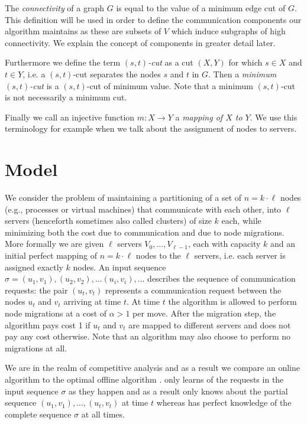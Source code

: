 \documentclass[a4paper,UKenglish,cleveref, autoref, thm-restate,authorcolumns]{lipics-v2019}
\newcommand{\opt}{\text{O{\scriptsize PT}}}
\newcommand{\onl}{\text{O{\scriptsize NL}}}
\begin{document}
The \textit{connectivity} of a graph $G$ is equal to the value of a minimum edge cut of $G$. This definition will be used in order to define the communication components our algorithm maintains as these are subsets of $V$ which induce subgraphs of high connectivity. We explain the concept of components in greater detail later.

Furthermore we define the term $(s,t)$\textit{-cut} as a cut $(X,Y)$ for which $s\in X$ and $t\in Y$, i.e. a $(s,t)$-cut separates the nodes $s$ and $t$ in $G$. Then a \textit{minimum $(s,t)$-cut} is a $(s,t)$-cut of minimum value. Note that a minimum $(s,t)$-cut is not necessarily a minimum cut.

Finally we call an injective function $m:X\rightarrow Y$ a \textit{mapping of $X$ to $Y$}. We use this terminology for example when we talk about the assignment of nodes to servers.

\sloppy

\section{Model}
\label{problem_definition_section}

We consider the problem of maintaining a partitioning of a 
set of $n=k\cdot \ell$ nodes (e.g., processes or virtual machines) 
that communicate with each other, 
into $\ell$ servers (henceforth sometimes also called clusters) of size $k$ each, 
while minimizing both the cost due to communication and due to node migrations. 
More formally we are given $\ell$ servers $V_0,...,V_{\ell-1}$, 
each with capacity $k$ and an initial perfect mapping of $n=k\cdot \ell$ nodes to the $\ell$ servers, 
i.e. each server is assigned exactly $k$ nodes. An input sequence $\sigma=(u_1, v_1), (u_2, v_2),...(u_i,v_i),...$ describes 
the sequence of communication requests: the pair $(u_t, v_t)$ represents a communication request between the nodes 
$u_t$ and $v_t$ arriving at time $t$. At time $t$ the algorithm is allowed to perform node migrations at a cost of $\alpha>1$ per move. 
After the migration step, the algorithm pays cost 1 if $u_t$ and $v_t$ are mapped to different servers and does not pay any cost otherwise. Note that an algorithm may also choose to perform no migrations at all.

We are in the realm of competitive analysis and as a result we compare an online algorithm \onl{} to the optimal offline algorithm \opt{}. \onl{} only learns of the requests in the input sequence $\sigma$ as they happen and as a result only knows about the partial sequence $(u_1,v_1),...,(u_t,v_t)$ at time $t$ whereas \opt{} has perfect knowledge of the complete sequence $\sigma$ at all times.
\end{document}
